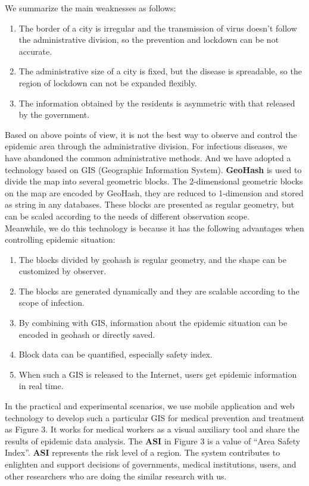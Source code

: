 \documentclass[sigplan,screen]{acmart}
\begin{document}
We summarize the main weaknesses as follows:
\begin{enumerate}
	\item The border of a city is irregular and the transmission of virus doesn't follow the administrative division, so the prevention and lockdown can be not accurate.
	\item The administrative size of a city is fixed, but the disease is spreadable, so the region of lockdown can not be expanded flexibly.
	\item The information obtained by the residents is asymmetric with that released by the government.
\end{enumerate}
Based on above points of view, it is not the best way to observe and control the epidemic area through the administrative division.
For infectious diseases, we have abandoned the common administrative methods. And we have adopted a technology based on GIS (Geographic Information System)\cite{clarke1986advances}. \textbf{GeoHash} is used to divide the map into several geometric blocks. The 2-dimensional geometric blocks on the map are encoded by GeoHash, they are reduced to 1-dimension and stored as string in any databases. These blocks are presented as regular geometry, but can be scaled according to the needs of different observation scope.
\\
Meanwhile, we do this technology is because it has the following advantages when controlling epidemic situation:
\begin{enumerate}
	\item The blocks divided by geohash is regular geometry, and the shape can be customized by observer.
	\item The blocks are generated dynamically and they are scalable according to the scope of infection.
	\item By combining with GIS, information about the epidemic situation can be encoded in geohash or directly saved.
	\item Block data can be quantified, especially safety index.
	\item When such a GIS is released to the Internet, users get epidemic information in real time.
\end{enumerate}
In the practical and experimental scenarios, we use mobile application and web technology to develop such a particular GIS for medical prevention and treatment as Figure 3. It works for medical workers as a visual auxiliary tool and share the results of epidemic data analysis. The \textbf{ASI} in Figure 3 is a value of ``Area Safety Index''. \textbf{ASI} represents the risk level of a region. The system contributes to enlighten and support decisions of governments, medical institutions, users, and other researchers who are doing the similar research with us.
\end{document}
